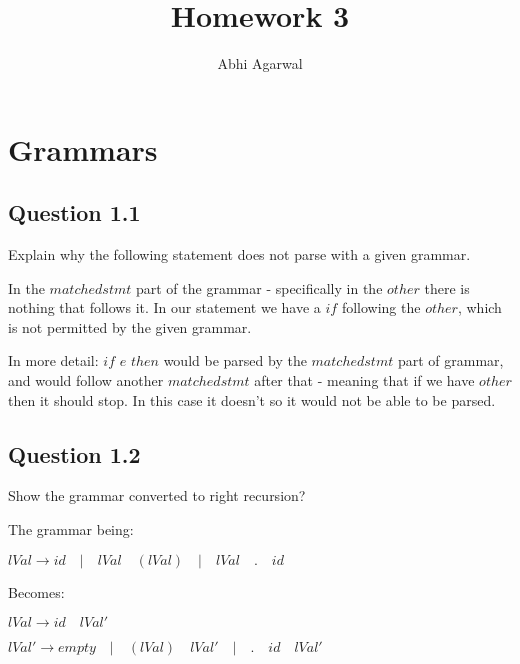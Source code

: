 \documentclass[11pt, oneside]{article}
\title{Homework 3}
\author{Abhi Agarwal}
\date{}
\begin{document}
\maketitle

\section{Grammars}
\subsection{Question 1.1}
\par Explain why the following statement does not parse with a given grammar.
\par In the $matchedstmt$ part of the grammar - specifically in the $other$ there is nothing that follows it. In our statement we have a $if$ following the $other$, which is not permitted by the given grammar.
\par In more detail: $if$ $e$ $then$ would be parsed by the $matchedstmt$ part of grammar, and would follow another $matchedstmt$ after that - meaning that if we have $other$ then it should stop. In this case it doesn't so it would not be able to be parsed.

\subsection{Question 1.2}
\par Show the grammar converted to right recursion?
\par \noindent The grammar being:
\par $lVal \rightarrow id \quad | \quad lVal \quad ( lVal ) \quad | \quad lVal \quad . \quad id$
\par \noindent Becomes:
\par $lVal \rightarrow id \quad lVal'$
\par $lVal' \rightarrow empty \quad | \quad (lVal) \quad lVal' \quad | \quad . \quad id \quad lVal'$
\end{document}

